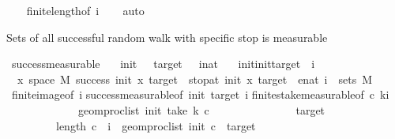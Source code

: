 \begin{isabellebody}
%
\isadelimproof
\ \ %
\endisadelimproof
%
\isatagproof
{}\isamarkupfalse%
\ finite{\isacharunderscore}{\kern0pt}length{\isacharbrackleft}{\kern0pt}of\ i{\isacharbrackright}{\kern0pt}\isanewline
\ \ \isamarkupfalse%
\ auto%
\endisatagproof
{\isafoldproof}%
%
\isadelimproof
%
\endisadelimproof
%
\begin{isamarkuptext}%
Sets of all successful random walk with specific stop is measurable%
\end{isamarkuptext}\isamarkuptrue%
\isamarkupfalse%
\ success{\isacharunderscore}{\kern0pt}measurable{}{\isacharcolon}{\kern0pt}\isanewline
\ \ \ init\ \ \ target\ \ \ i{\isacharcolon}{\kern0pt}{\isacharcolon}{\kern0pt}nat\isanewline
\ \ \ {\isachardoublequoteopen}{}{\isacharless}{\kern0pt}init{\isachardoublequoteclose}{\isachardoublequoteopen}init{\isacharless}{\kern0pt}target{\isachardoublequoteclose}{\isachardoublequoteopen}{}\ {\isasymle}\ i{\isachardoublequoteclose}\isanewline
\ \ x{\isasymin}\ space\ M{\isachardot}{\kern0pt}\ success\ init\ x\ target\ {\isasymand}\ stop{\isacharunderscore}{\kern0pt}at\ init\ x\ target\ {\isacharequal}{\kern0pt}\ enat\ i{\isacharbraceright}{\kern0pt}\ {\isasymin}\ sets\ M{\isachardoublequoteclose}\isanewline
%
\isadelimproof
\ \ %
\endisadelimproof
%
\isatagproof
{}\isamarkupfalse%
\ finite{\isacharunderscore}{\kern0pt}image{\isacharbrackleft}{\kern0pt}of\ i{\isacharbrackright}{\kern0pt}\isanewline
success{\isacharunderscore}{\kern0pt}measurable{}{\isacharbrackleft}{\kern0pt}of\ init\ target\ i{\isacharbrackright}{\kern0pt}\isanewline
finite{\isacharunderscore}{\kern0pt}stake{\isacharunderscore}{\kern0pt}measurable{\isacharbrackleft}{\kern0pt}of\ {\isachardoublequoteopen}{\isacharbraceleft}{\kern0pt}c{\isachardot}{\kern0pt}\ {\isacharparenleft}{\kern0pt}{\isasymforall}k{\isacharless}{\kern0pt}i{\isachardot}{\kern0pt}\isanewline
\ \ \ \ \ \ \ \ \ \ \ \ \ geom{\isacharunderscore}{\kern0pt}proc{\isacharunderscore}{\kern0pt}list\ init\ {\isacharparenleft}{\kern0pt}take\ k\ c{\isacharparenright}{\kern0pt}\isanewline
\ \ \ \ \ \ \ \ \ \ \ \ \ {\isasymnotin}\ {\isacharbraceleft}{\kern0pt}{}{\isacharcomma}{\kern0pt}\ target{\isacharbraceright}{\kern0pt}{\isacharparenright}{\kern0pt}\ {\isasymand}\isanewline
\ \ \ \ \ \ \ \ \ length\ c\ {\isacharequal}{\kern0pt}\ i\ {\isasymand}\ geom{\isacharunderscore}{\kern0pt}proc{\isacharunderscore}{\kern0pt}list\ init\ c\ {\isacharequal}{\kern0pt}\ target{\isacharbraceright}{\kern0pt}{\isachardoublequoteclose}{\isacharbrackright}{\kern0pt}\isanewline

\end{isabellebody}
